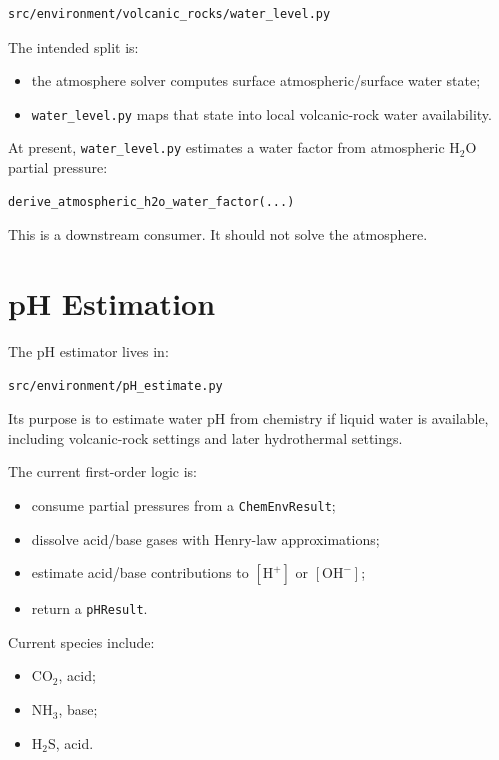 \documentclass[11pt]{article}
\begin{document}
\begin{lstlisting}
src/environment/volcanic_rocks/water_level.py
\end{lstlisting}

The intended split is:

\begin{itemize}
  \item the atmosphere solver computes surface atmospheric/surface water state;
  \item \texttt{water\_level.py} maps that state into local volcanic-rock water
        availability.
\end{itemize}

At present, \texttt{water\_level.py} estimates a water factor from atmospheric
\(\mathrm{H_2O}\) partial pressure:

\begin{lstlisting}
derive_atmospheric_h2o_water_factor(...)
\end{lstlisting}

This is a downstream consumer. It should not solve the atmosphere.

\section{pH Estimation}

The pH estimator lives in:

\begin{lstlisting}
src/environment/pH_estimate.py
\end{lstlisting}

Its purpose is to estimate water pH from chemistry if liquid water is available,
including volcanic-rock settings and later hydrothermal settings.

The current first-order logic is:

\begin{itemize}
  \item consume partial pressures from a \texttt{ChemEnvResult};
  \item dissolve acid/base gases with Henry-law approximations;
  \item estimate acid/base contributions to \([\mathrm{H^+}]\) or
        \([\mathrm{OH^-}]\);
  \item return a \texttt{pHResult}.
\end{itemize}

Current species include:

\begin{itemize}
  \item \(\mathrm{CO_2}\), acid;
  \item \(\mathrm{NH_3}\), base;
  \item \(\mathrm{H_2S}\), acid.
\end{itemize}
\end{document}
